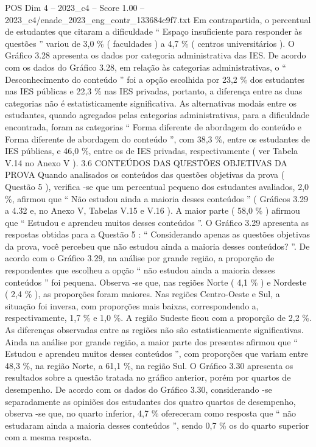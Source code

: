 \begin{textsample}{POS Dim 4 – 2023\_c4 – Score 1.00 – 2023\_c4/enade\_2023\_eng\_contr\_133684c9f7.txt}
Em contrapartida, o percentual de estudantes que citaram a dificuldade “ Espaço insuficiente para responder às questões ” variou de 3,0 \% ( faculdades ) a 4,7 \% ( centros universitários ).
O Gráfico 3.28 apresenta os dados por categoria administrativa das IES.
De acordo com os dados do Gráfico 3.28, em relação às categorias administrativas, o “ Desconhecimento do conteúdo ” foi a opção escolhida por 23,2 \% dos estudantes nas IES públicas e 22,3 \% nas IES privadas, portanto, a diferença entre as duas categorias não é estatisticamente significativa.
As alternativas modais entre os estudantes, quando agregados pelas categorias administrativas, para a dificuldade encontrada, foram as categorias “ Forma diferente de abordagem do conteúdo e Forma diferente de abordagem do conteúdo ”, com 38,3 \%, entre os estudantes de IES públicas, e 46,0 \%, entre os de IES privadas, respectivamente ( ver Tabela V.14 no Anexo V ). 3.6 CONTEÚDOS DAS QUESTÕES OBJETIVAS DA PROVA Quando analisados os conteúdos das questões objetivas da prova ( Questão 5 ), verifica -se que um percentual pequeno dos estudantes avaliados, 2,0 \%, afirmou que “ Não estudou ainda a maioria desses conteúdos ” ( Gráficos 3.29 a 4.32 e, no Anexo V, Tabelas V.15 e V.16 ).
A maior parte ( 58,0 \% ) afirmou que “ Estudou e aprendeu muitos desses conteúdos ”.
O Gráfico 3.29 apresenta as respostas obtidas para a Questão 5 : “ Considerando apenas as questões objetivas da prova, você percebeu que não estudou ainda a maioria desses conteúdos? ”.
De acordo com o Gráfico 3.29, na análise por grande região, a proporção de respondentes que escolheu a opção “ não estudou ainda a maioria desses conteúdos ” foi pequena.
Observa -se que, nas regiões Norte ( 4,1 \% ) e Nordeste ( 2,4 \% ), as proporções foram maiores.
Nas regiões Centro-Oeste e Sul, a situação foi inversa, com proporções mais baixas, correspondendo a, respectivamente, 1,7 \% e 1,0 \%.
A região Sudeste ficou com a proporção de 2,2 \%.
As diferenças observadas entre as regiões não são estatisticamente significativas.
Ainda na análise por grande região, a maior parte dos presentes afirmou que “ Estudou e aprendeu muitos desses conteúdos ”, com proporções que variam entre 48,3 \%, na região Norte, a 61,1 \%, na região Sul.
O Gráfico 3.30 apresenta os resultados sobre a questão tratada no gráfico anterior, porém por quartos de desempenho.
De acordo com os dados do Gráfico 3.30, considerando -se separadamente as opiniões dos estudantes dos quatro quartos de desempenho, observa -se que, no quarto inferior, 4,7 \% ofereceram como resposta que “ não estudaram ainda a maioria desses conteúdos ”, sendo 0,7 \% os do quarto superior com a mesma resposta.

\end{textsample}
